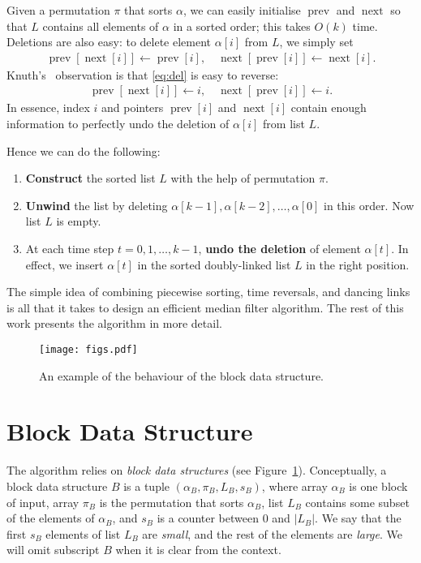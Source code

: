 \documentclass[a4paper,11pt]{article}
\DeclareMathOperator{\prev}{prev}
\DeclareMathOperator{\next}{next}
\begin{document}
Given a permutation $\pi$ that sorts $\alpha$, we can easily initialise $\prev$ and $\next$ so that $L$ contains all elements of $\alpha$ in a sorted order; this takes $O(k)$ time. Deletions are also easy: to delete element $\alpha[i]$ from $L$, we simply set
\begin{align}
    \label{eq:del}
    \prev[\next[i]] \gets \prev[i], \quad \next[\prev[i]] \gets \next[i].
\end{align}
Knuth's~\cite{knuth00dancinglinks} observation is that \eqref{eq:del} is easy to reverse:
\begin{align}
    \label{eq:undo-del}
    \prev[\next[i]] \gets i, \quad \next[\prev[i]] \gets i.
\end{align}
In essence, index $i$ and pointers $\prev[i]$ and $\next[i]$ contain enough information to perfectly undo the deletion of $\alpha[i]$ from list $L$.

\pagebreak

Hence we can do the following:
\begin{enumerate}[noitemsep]
    \item \textbf{Construct} the sorted list $L$ with the help of permutation $\pi$.
    \item \textbf{Unwind} the list by deleting $\alpha[k-1], \alpha[k-2], \dots, \alpha[0]$ in this order. Now list $L$ is empty.
    \item At each time step $t = 0, 1, \dotsc, k-1$, \textbf{undo the deletion} of element $\alpha[t]$. In effect, we insert $\alpha[t]$ in the sorted doubly-linked list $L$ in the right position.
\end{enumerate}

The simple idea of combining piecewise sorting, time reversals, and dancing links is all that it takes to design an efficient median filter algorithm. The rest of this work presents the algorithm in more detail.


\begin{figure}
    \centering
    \texttt{[image: figs.pdf]}
    \caption{An example of the behaviour of the block data structure.}\label{fig:block}
\end{figure}

\section{Block Data Structure}\label{sec:block}

The algorithm relies on \emph{block data structures} (see Figure~\ref{fig:block}). Conceptually, a block data structure $B$ is a tuple $(\alpha_B,\pi_B,L_B,s_B)$, where array $\alpha_B$ is one block of input, array $\pi_B$ is the permutation that sorts $\alpha_B$, list $L_B$ contains some subset of the elements of $\alpha_B$, and $s_B$ is a counter between $0$ and $|L_B|$. We say that the first $s_B$ elements of list $L_B$ are \emph{small}, and the rest of the elements are \emph{large}. We will omit subscript $B$ when it is clear from the context.
\end{document}
